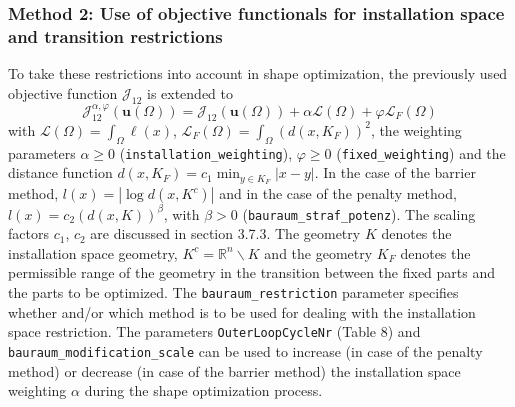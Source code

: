 \documentclass[oneside]{article}
\numberwithin{equation}{section}
\numberwithin{figure}{section}
\newcommand{\Om }{ \Omega}
\newcommand{\buu}{\boldsymbol{u}}
\newcommand{\LL }{ \mathcal{L}}
\newcommand{\JJ }{ \mathcal{J}}
\numberwithin{figure}{section}
\begin{document}
\subsubsection{Method 2: Use of objective functionals for installation space and transition restrictions}
To take these restrictions into account in shape optimization, the previously used objective function $\mathcal{J}_12$ is extended to
\begin{equation}
\nonumber  \JJ_{12}^{\alpha,\varphi}\left( \buu \left( \Om \right) \right)=\JJ_{12}\left( \buu \left( \Om \right) \right)+ \alpha \LL\left(\Om\right) + \varphi \LL_F\left(\Om\right)
\end{equation}
with $\LL\left(\Om\right)=\int_\Om \ell\left( x \right)$, $\LL_{F}\left(\Om\right)= \int_{\Om} (d(x,K_F))^2$, the weighting parameters $\alpha\ge 0$ (\verb|installation_weighting|), $\varphi\ge 0$ (\verb|fixed_weighting|) and the distance function $d(x,K_F) = c_1\min_{y\in K_F} |x - y|$. In the case of the barrier method, $l(x) = |\log d(x,K^c)|$ and in the case of the penalty method, $l(x) = c_2(d(x,K))^\beta$, with $\beta > 0$ (\verb|bauraum_straf_potenz|). The scaling factors $c_1$, $c_2$ are discussed in section 3.7.3. The geometry $K$ denotes the installation space geometry, $K^c = \mathbb{R}^n\backslash K$ and the geometry $K_F$ denotes the permissible range of the geometry in the transition between the fixed parts and the parts to be optimized. The \verb|bauraum_restriction| parameter specifies whether and/or which method is to be used for dealing with the installation space restriction. The parameters \texttt{OuterLoopCycleNr} (Table 8) and \verb|bauraum_modification_scale| can be used to increase (in case of the penalty method) or decrease (in case of the barrier method) the installation space weighting $\alpha$ during the shape optimization process.
\end{document}

